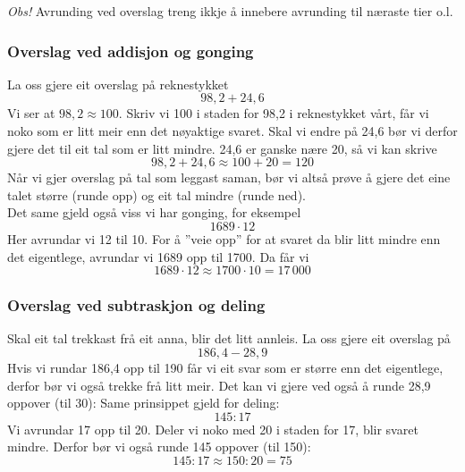\textit{Obs!} Avrunding ved overslag treng ikkje å innebere avrunding til næraste tier o.l.\vsk


\subsubsection{Overslag ved addisjon og gonging}
La oss gjere  eit overslag på reknestykket
\[ 98,2+24,6 \]
Vi ser at $ 98,2\approx 100 $. Skriv vi 100 i staden for 98,2 i reknestykket vårt, får vi noko som er litt meir enn det nøyaktige svaret. Skal vi endre på 24,6 bør vi derfor gjere det til eit tal som er litt mindre. 24,6 er ganske nære 20, så vi kan skrive 
\[ 98,2+24,6 \approx 100 + 20 = 120 \]
Når vi gjer overslag på tal som leggast saman, bør vi altså prøve å gjere det eine talet større (runde opp) og  eit  tal mindre (runde ned).\\

\linje
Det same gjeld også viss vi har gonging, for eksempel
\[ 1689\cdot12 \]
Her avrundar vi 12 til 10. For å ''veie opp'' for at svaret da blir litt mindre enn det eigentlege, avrundar vi 1689 opp til 1700. Da får vi
\[ 1689\cdot12\approx 1700\cdot 10 =17\,000 \]
\subsubsection{Overslag ved subtraskjon og deling}
Skal  eit  tal trekkast frå  eit  anna, blir det litt annleis. La oss gjere  eit overslag på
\[ 186,4-28,9 \]
Hvis vi rundar 186,4 opp til 190 får vi  eit  svar som er større enn det eigentlege, derfor bør vi også trekke frå litt meir. Det kan vi gjere ved også å runde 28,9 oppover (til 30):
Same prinsippet gjeld for deling: 
\[ 145:17 \]
Vi avrundar 17 opp til 20. Deler vi noko med 20 i staden for 17, blir svaret mindre. Derfor bør vi også runde 145 oppover (til 150):
\[ 145:17 \approx 150:20 = 75 \]

